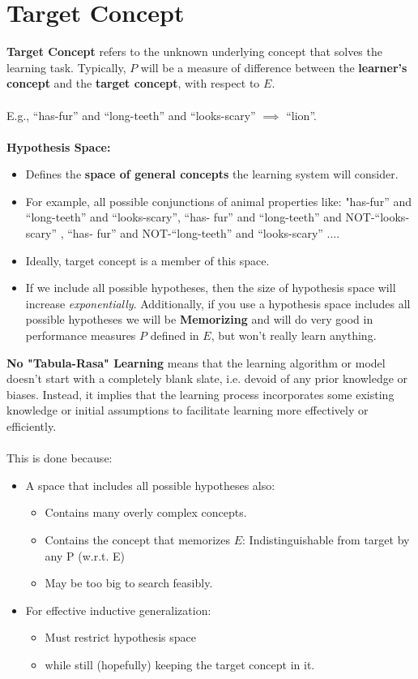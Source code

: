 \documentclass[12pt, a4paper]{book}
\begin{document}
\section{Target Concept}
\textbf{Target Concept} refers to the unknown underlying concept that solves the learning task. Typically, $P$ will be a measure of difference between the \textbf{learner’s concept} and the \textbf{target concept}, with respect to $E$.\\\\
E.g., “has-fur” and “long-teeth” and “looks-scary” $\implies$ “lion”.\\\\
\textbf{Hypothesis Space:}
\begin{itemize}
    \item Defines the \textbf{space of general concepts} the
learning system will consider.
    \item For example, all possible conjunctions of animal properties like: "has-fur” and “long-teeth” and “looks-scary”, “has-
fur” and “long-teeth” and NOT-“looks-scary” , “has-
fur” and NOT-“long-teeth” and “looks-scary” ....
    \item Ideally, target concept is a member of this space.
    \item If we include all possible hypotheses, then the size of hypothesis space will increase \textit{exponentially}. Additionally, if you use a hypothesis space includes all possible hypotheses we will be \textbf{Memorizing} and will do very good in performance measures $P$ defined in $E$, but won't really learn anything.\\
\end{itemize}
\textbf{No "Tabula-Rasa" Learning} means that the learning algorithm or model doesn't start with a completely blank slate, i.e. devoid of any prior knowledge or biases. Instead, it implies that the learning process incorporates some existing knowledge or initial assumptions to facilitate learning more effectively or efficiently.\\\\
This is done because:
\begin{itemize}
    \item A space that includes all possible hypotheses also:
    \begin{itemize}
        \item Contains many overly complex concepts.
        \item Contains the concept that memorizes $E$: Indistinguishable from target by any P (w.r.t. E)
        \item May be too big to search feasibly.
    \end{itemize}
    \item For effective inductive generalization:
    \begin{itemize}
        \item Must restrict hypothesis space
        \item while still (hopefully) keeping the target concept in it.\\
    \end{itemize}
\end{itemize}
\end{document}
